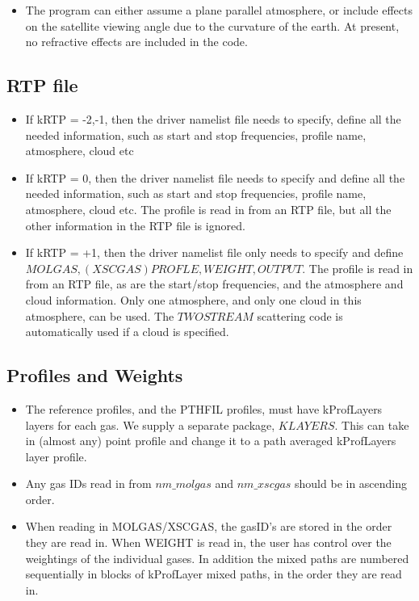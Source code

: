 \documentclass[12pt]{article}
\begin{document}
{{{\begin{itemize}
\item The program can either assume a plane parallel atmosphere, or
  include effects on the satellite viewing angle due to the curvature
  of the earth.  At present, no refractive effects are included in the
  code.
\end{itemize}

\subsection{RTP file}
\begin{itemize}
\item If kRTP = -2,-1, then the driver namelist file needs to specify, define
      all the needed information, such as start and stop frequencies, profile 
      name, atmosphere, cloud etc
\item If kRTP = 0, then the driver namelist file needs to specify and define
      all the needed information, such as start and stop frequencies, profile 
      name, atmosphere, cloud etc. The profile is read in from an RTP file, but
      all the other information in the RTP file is ignored.
\item If kRTP = +1, then the driver namelist file only needs to specify and 
      define $MOLGAS, (XSCGAS) PROFLE, WEIGHT, OUTPUT$. The profile is read 
      in from an RTP file, as are the start/stop frequencies, and the
      atmosphere and cloud information. Only one atmosphere, and only one cloud
      in this atmosphere, can be used. The $TWOSTREAM$ scattering code is
      automatically used if a cloud is specified. 
\end{itemize}

\subsection{Profiles and Weights}

\begin{itemize}
\item The reference profiles, and the PTHFIL profiles, must have kProfLayers
  layers for each gas.  We supply a separate package, $KLAYERS$. This can 
  take in (almost any) point profile and change it to a path averaged 
  kProfLayers layer profile.
  
\item Any gas IDs read in from $nm\_molgas$ and $nm\_xscgas$ should be in
  ascending order.
  
\item When reading in MOLGAS/XSCGAS, the gasID's are stored in the
  order they are read in.  When WEIGHT is read in, the user has
  control over the weightings of the individual gases.  In addition
  the mixed paths are numbered sequentially in blocks of
  kProfLayer mixed paths, in the order they are read in.  


\end{itemize}}}}
\end{document}
